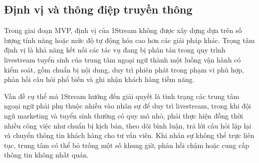 %
%
%
%
%
%


\subsection{Định vị và thông điệp truyền thông}

Trong giai đoạn MVP, định vị của 1Stream không được xây dựng dựa trên số lượng tính năng hoặc mức độ tự động hóa cao hơn các giải pháp khác. Trọng tâm định vị là khả năng kết nối các tác vụ đang bị phân tán trong quy trình livestream tuyển sinh của trung tâm ngoại ngữ thành một luồng vận hành có kiểm soát, gồm chuẩn bị nội dung, duy trì phiên phát trong phạm vi phù hợp, phản hồi câu hỏi phổ biến và ghi nhận khách hàng tiềm năng.

Vấn đề cụ thể mà 1Stream hướng đến giải quyết là tình trạng các trung tâm ngoại ngữ phải phụ thuộc nhiều vào nhân sự để duy trì livestream, trong khi đội ngũ marketing và tuyển sinh thường có quy mô nhỏ, phải thực hiện đồng thời nhiều công việc như chuẩn bị kịch bản, theo dõi bình luận, trả lời câu hỏi lặp lại và chuyển thông tin khách hàng cho tư vấn viên. Khi nhân sự không thể trực liên tục, trung tâm có thể bỏ trống một số khung giờ, phản hồi chậm hoặc cung cấp thông tin không nhất quán.

